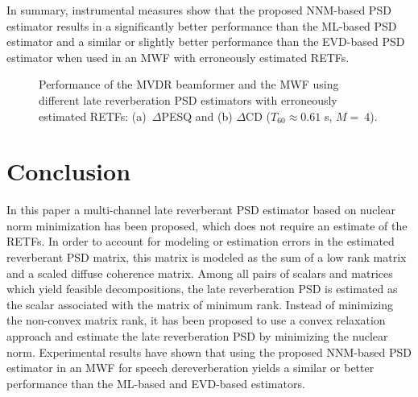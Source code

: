 \documentclass{article}
\begin{document}
In summary, instrumental measures show that the proposed NNM-based PSD estimator results in a significantly better performance than the ML-based PSD estimator and a similar or slightly better performance than the EVD-based PSD estimator when used in an MWF with erroneously estimated RETFs.
\begin{figure}[t!]
  
  
\caption{Performance of the MVDR beamformer and the MWF using different late reverberation PSD estimators with erroneously estimated RETFs: (a)~$\Delta$PESQ and (b) $\Delta$CD ($T_{60} \approx 0.61$ s, $M =~4$).}
\label{fig: erroneous}
\end{figure}

\section{Conclusion}
In this paper a multi-channel late reverberant PSD estimator based on nuclear norm minimization has been proposed, which does not require an estimate of the RETFs.
In order to account for modeling or estimation errors in the estimated reverberant PSD matrix, this matrix is modeled as the sum of a low rank matrix and a scaled diffuse coherence matrix.
Among all pairs of scalars and matrices which yield feasible decompositions, the late reverberation PSD is estimated as the scalar associated with the matrix of minimum rank.
Instead of minimizing the non-convex matrix rank, it has been proposed to use a convex relaxation approach and estimate the late reverberation PSD by minimizing the nuclear norm.
Experimental results have shown that using the proposed NNM-based PSD estimator in an MWF for speech dereverberation yields a similar or better performance than the ML-based and EVD-based estimators.


\end{document}
